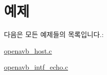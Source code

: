 \section{예제}
다음은 모든 예제들의 목록입니다.\+:\begin{DoxyCompactItemize}
\item 
\hyperlink{openavb_host_8c-example}{openavb\+\_\+host.\+c}
\item 
\hyperlink{openavb_intf_echo_8c-example}{openavb\+\_\+intf\+\_\+echo.\+c}
\end{DoxyCompactItemize}

